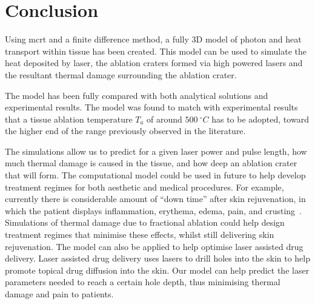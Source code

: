 
\section{Conclusion}

Using \gls*{mcrt} and a finite difference method, a fully 3D model of photon and heat transport within tissue has been created. This model can be used to simulate the heat deposited by laser, the ablation craters formed via high powered lasers and the resultant thermal damage surrounding the ablation crater.

The model has been fully compared with both analytical solutions and experimental results. 
The model was found to match with experimental results that a tissue ablation temperature $T_a$ of around $500~^{\circ}C$ has to be adopted, toward the higher end of the range previously observed in the literature.

The simulations allow us to predict for a given laser power and pulse length, how much thermal damage is caused in the tissue, and how deep an ablation crater that will form. The computational model could be used in future to help develop treatment regimes for both aesthetic and medical procedures. For example, currently there is considerable amount of ``down time'' after skin rejuvenation, in which the patient displays inflammation, erythema, edema, pain, and crusting~\cite{lapidoth2014fractional,trelles2011safe,kohl2015fractional}. Simulations of thermal damage due to fractional ablation could help design treatment regimes that minimise these effects, whilst still delivering skin rejuvenation.
The model can also be applied to help optimise laser assisted drug delivery. 
Laser assisted drug delivery uses lasers to drill holes into the skin to help promote topical drug diffusion into the skin.
Our model can help predict the laser parameters needed to reach a certain hole depth, thus minimising thermal damage and pain to patients.

